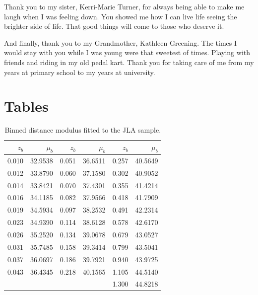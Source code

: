 \documentclass[12pt,twoside]{report}   %
\begin{document}
Thank you to my sister, Kerri-Marie Turner, for always being able to make me laugh when I was feeling down. You showed me how I can live life seeing the brighter side of life. That good things will come to those who deserve it.

And finally, thank you to my Grandmother, Kathleen Greening. The times I would stay with you while I was young were that sweetest of times. Playing with friends and riding in my old pedal kart. Thank you for taking care of me from my years at primary school to my years at university.



\pagebreak

\appendix
\chapter{Tables}

\begin{table}[H]
  \centering
  \caption{Binned distance modulus fitted to the JLA sample.}
  \label{tab:mub}
    \begin{tabular}{*{2}{rr|}rr}
    \hline
    \hline
    $z_b$ & $\mu_b$ &$z_b$ & $\mu_b$ &$z_b$ & $\mu_b$ \\
\hline
0.010 & 32.9538  & 0.051 &  36.6511 &  0.257 &  40.5649\\
0.012 & 33.8790  & 0.060 &  37.1580 &  0.302 &  40.9052\\ 
0.014 & 33.8421  & 0.070 &  37.4301 &  0.355 &  41.4214\\
0.016 & 34.1185  & 0.082 &  37.9566 &  0.418 &  41.7909\\
0.019 & 34.5934  & 0.097 &  38.2532 &  0.491 &  42.2314\\
0.023 & 34.9390  & 0.114 &  38.6128 &  0.578 &  42.6170\\
0.026 & 35.2520  & 0.134 &  39.0678 &  0.679 &  43.0527\\
0.031 & 35.7485  & 0.158 &  39.3414 &  0.799 &  43.5041\\
0.037 & 36.0697  & 0.186 &  39.7921 &  0.940 &  43.9725\\
0.043 & 36.4345  & 0.218 &  40.1565 &  1.105 &  44.5140\\
&&&&                                        1.300 &44.8218\\
    \hline
  \end{tabular}
\end{table}
\end{document}

